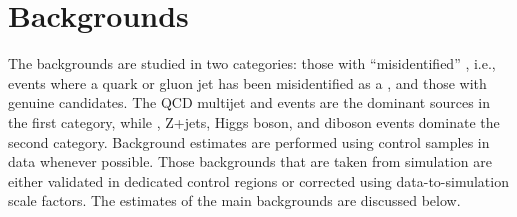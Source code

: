 \section{Backgrounds}
\label{sect:bkg}
The backgrounds are studied in two categories: those with 
``misidentified'' \Tau, i.e., events where a quark or gluon jet has been misidentified
as a \Tau, and those with genuine \Tau candidates.
The QCD multijet and \wjets events are the dominant sources in the first category, while \ttbar, Z+jets, Higgs boson, and diboson
events dominate the second category. Background estimates are performed using control samples in data whenever possible. 
Those backgrounds that are taken from simulation are either validated in dedicated control regions or corrected using data-to-simulation scale factors. The estimates of the main backgrounds are discussed below.


